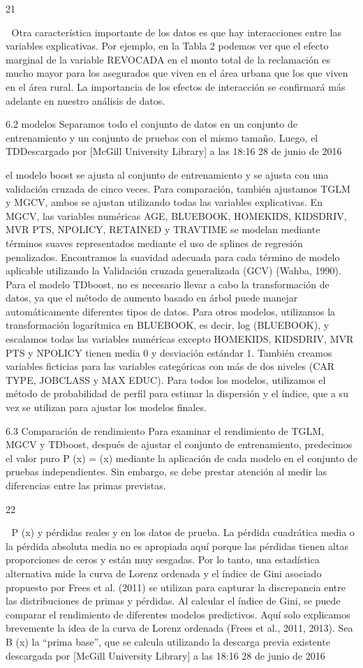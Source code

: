 \documentclass[]{article}
\begin{document}
21

 Otra característica importante de los datos es que hay interacciones
entre las variables explicativas. Por ejemplo, en la Tabla 2 podemos ver
que el efecto marginal de la variable REVOCADA en el monto total de la
reclamación es mucho mayor para los asegurados que viven en el área
urbana que los que viven en el área rural. La importancia de los efectos
de interacción se confirmará más adelante en nuestro análisis de datos.

6.2 modelos Separamos todo el conjunto de datos en un conjunto de
entrenamiento y un conjunto de pruebas con el mismo tamaño. Luego, el
TDDescargado por {[}McGill University Library{]} a las 18:16 28 de junio
de 2016

el modelo boost se ajusta al conjunto de entrenamiento y se ajusta con
una validación cruzada de cinco veces. Para comparación, también
ajustamos TGLM y MGCV, ambos se ajustan utilizando todas las variables
explicativas. En MGCV, las variables numéricas AGE, BLUEBOOK, HOMEKIDS,
KIDSDRIV, MVR PTS, NPOLICY, RETAINED y TRAVTIME se modelan mediante
términos suaves representados mediante el uso de splines de regresión
penalizados. Encontramos la suavidad adecuada para cada término de
modelo aplicable utilizando la Validación cruzada generalizada (GCV)
(Wahba, 1990). Para el modelo TDboost, no es necesario llevar a cabo la
transformación de datos, ya que el método de aumento basado en árbol
puede manejar automáticamente diferentes tipos de datos. Para otros
modelos, utilizamos la transformación logarítmica en BLUEBOOK, es decir,
log (BLUEBOOK), y escalamos todas las variables numéricas excepto
HOMEKIDS, KIDSDRIV, MVR PTS y NPOLICY tienen media 0 y desviación
estándar 1. También creamos variables ficticias para las variables
categóricas con más de dos niveles (CAR TYPE, JOBCLASS y MAX EDUC). Para
todos los modelos, utilizamos el método de probabilidad de perfil para
estimar la dispersión y el índice, que a su vez se utilizan para ajustar
los modelos finales.

6.3 Comparación de rendimiento Para examinar el rendimiento de TGLM,
MGCV y TDboost, después de ajustar el conjunto de entrenamiento,
predecimos el valor puro P (x) = (x) mediante la aplicación de cada
modelo en el conjunto de pruebas independientes. Sin embargo, se debe
prestar atención al medir las diferencias entre las primas previstas.

22

 P (x) y pérdidas reales y en los datos de prueba. La pérdida
cuadrática media o la pérdida absoluta media no es apropiada aquí porque
las pérdidas tienen altas proporciones de ceros y están muy sesgadas.
Por lo tanto, una estadística alternativa mide la curva de Lorenz
ordenada y el índice de Gini asociado propuesto por Frees et al. (2011)
se utilizan para capturar la discrepancia entre las distribuciones de
primas y pérdidas. Al calcular el índice de Gini, se puede comparar el
rendimiento de diferentes modelos predictivos. Aquí solo explicamos
brevemente la idea de la curva de Lorenz ordenada (Frees et al., 2011,
2013). Sea B (x) la ``prima base'', que se calcula utilizando la
descarga previa existente descargada por {[}McGill University Library{]}
a las 18:16 28 de junio de 2016
\end{document}
